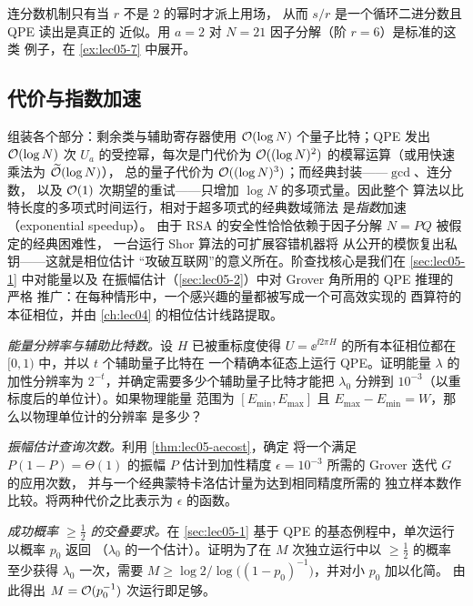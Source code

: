 连分数机制只有当 $r$ 不是 $2$ 的幂时才派上用场，
从而 $s/r$ 是一个循环二进分数且 QPE 读出是真正的
近似。用 $a=2$ 对 $N=21$ 因子分解（阶 $r=6$）是标准的这类
例子，在 \cref{ex:lec05-7} 中展开。

\subsection*{代价与指数加速}

组装各个部分：剩余类与辅助寄存器使用 $\mathcal{O}(\log N)$
个量子比特；QPE 发出 $\mathcal{O}(\log N)$ 次 $U_a$ 的受控幂，每次是门代价为
$\mathcal{O}((\log N)^{2})$ 的模幂运算（或用快速乘法为 $\widetilde{\mathcal{O}}(\log N)$），
总的量子代价为
$\mathcal{O}((\log N)^{3})$；而经典封装——$\gcd$、连分数，
以及 $\mathcal{O}(1)$ 次期望的重试——只增加 $\log N$ 的多项式量。因此整个
算法以比特长度的多项式时间运行，相对于超多项式的经典数域筛法
是\emph{指数}加速（exponential speedup）。
由于 RSA 的安全性恰恰依赖于因子分解 $N=PQ$ 被假定的经典困难性，
一台运行 Shor 算法的可扩展容错机器将
从公开的模恢复出私钥——这就是相位估计
“攻破互联网”的意义所在。阶查找核心是我们在 \cref{sec:lec05-1} 中对能量以及
在振幅估计（\cref{sec:lec05-2}）中对 Grover 角所用的 QPE 推理的严格
推广：在每种情形中，一个感兴趣的量都被写成一个可高效实现的
酉算符的本征相位，并由 \cref{ch:lec04} 的相位估计线路提取。

\exercisesection
\begin{exercise}\label{ex:lec05-1}
\emph{能量分辨率与辅助比特数。}设 $H$ 已被重标度使得
$U=\ee^{\ii 2\pi H}$ 的所有本征相位都在 $[0,1)$ 中，并以 $t$ 个辅助量子比特在
一个精确本征态上运行 QPE。证明能量 $\lambda$ 的加性分辨率为
$2^{-t}$，并确定需要多少个辅助量子比特才能把 $\lambda_0$ 分辨到
$10^{-3}$（以重标度后的单位计）。如果物理能量
范围为 $[E_{\min},E_{\max}]$ 且 $E_{\max}-E_{\min}=W$，那么以物理单位计的分辨率
是多少？
\end{exercise}

\begin{exercise}\label{ex:lec05-2}
\emph{振幅估计查询次数。}利用 \cref{thm:lec05-aecost}，确定
将一个满足 $P(1-P)=\Theta(1)$ 的振幅 $P$ 估计到加性精度 $\epsilon=10^{-3}$
所需的 Grover 迭代 $G$ 的应用次数，
并与一个经典蒙特卡洛估计量为达到相同精度所需的
独立样本数作比较。将两种代价之比表示为
$\epsilon$ 的函数。
\end{exercise}

\begin{exercise}\label{ex:lec05-3}
\emph{成功概率 $\ge\tfrac12$ 的交叠要求。}在
\cref{sec:lec05-1} 基于 QPE 的基态例程中，单次运行以概率 $p_0$ 返回
（$\lambda_0$ 的一个估计）。证明为了在 $M$ 次独立运行中以 $\ge\tfrac12$ 的概率
至少获得 $\lambda_0$ 一次，需要
$M\ge\log 2/\log\bigl((1-p_0)^{-1}\bigr)$，并对小 $p_0$ 加以化简。
由此得出 $M=\mathcal{O}(p_0^{-1})$ 次运行即足够。
\end{exercise}

